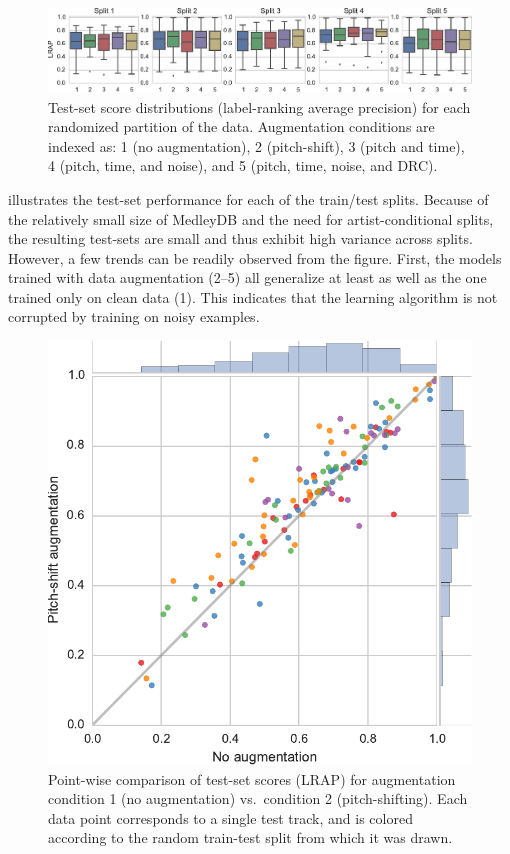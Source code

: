 \documentclass{article}
\begin{document}
\begin{figure}[ht]
    \centering
    \includegraphics[width=\textwidth]{figs/lrap}
    \caption{Test-set score distributions (label-ranking average precision) for each 
        randomized partition of the data.
        Augmentation conditions are indexed as: 1 (no augmentation), 2 (pitch-shift), 3
        (pitch and time), 4 (pitch, time, and noise), and 5 (pitch, time, noise, and
        DRC).\label{lrapresults}}
\end{figure}

 illustrates the test-set performance for each of the train/test
splits.  Because of the relatively small size of MedleyDB and the need for 
artist-conditional splits, the resulting test-sets are small and thus exhibit high
variance across splits.  However, a few trends can be readily observed from the figure. 
First, the models trained with data augmentation (2--5) all generalize at least as well 
as the one trained only on clean data (1).  This indicates that the learning algorithm is
not corrupted by training on noisy examples.

\begin{figure}
    \centering
    \includegraphics[width=\columnwidth]{figs/onevstwo}
    \caption{Point-wise comparison of test-set scores (LRAP) 
        for augmentation condition 1 (no augmentation) vs.\ condition 2 (pitch-shifting).
        Each data point corresponds to a single test track, and is colored according to 
        the random train-test split from which it was drawn.\label{onevstwo}}
\end{figure}
\end{document}
